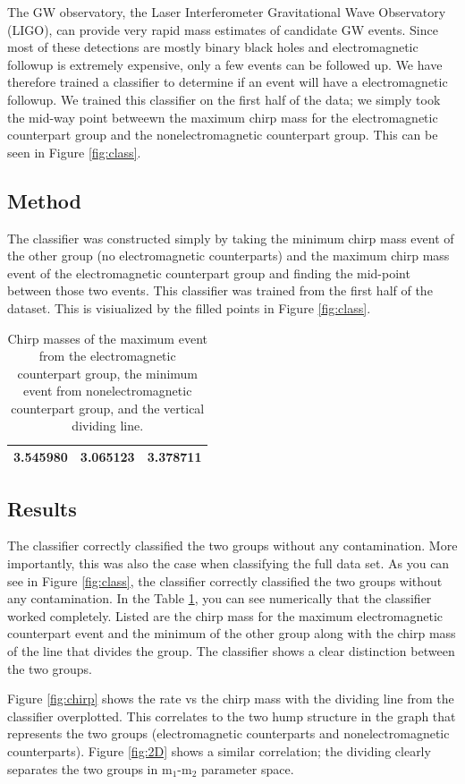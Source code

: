 The GW observatory, the Laser Interferometer Gravitational Wave Observatory (LIGO), can provide very rapid mass estimates of candidate GW events. Since most of these detections are mostly binary black holes and electromagnetic followup is extremely expensive, only a few events can be followed up. We have therefore trained a classifier to determine if an event will have a electromagnetic followup. We trained this classifier on the first half of the data; we simply took the mid-way point betweewn the maximum chirp mass for the electromagnetic counterpart group and the nonelectromagnetic counterpart group. This can be seen in Figure \ref{fig:class}.


\subsection{Method}
The classifier was constructed simply by taking the minimum chirp mass event of the other group (no electromagnetic counterparts) and the maximum chirp mass event of the electromagnetic counterpart group and finding the mid-point between those two events. This classifier was trained from the first half of the dataset. This is visiualized by the filled points in Figure \ref{fig:class}.

\begin{table}[ht]
\caption{Chirp masses of the maximum event from the electromagnetic counterpart group, the minimum event from nonelectromagnetic counterpart group, and the vertical dividing line.}
\centering
\begin{tabular}{c c c}

\hline\hline
3.545980 & 3.065123 & 3.378711\\
\hline\hline
\end{tabular}
\label{tab:mass}
\end{table}

\subsection{Results}
The classifier correctly classified the two groups without any contamination. More importantly, this was also the case when classifying the full data set. As you can see in Figure \ref{fig:class}, the classifier correctly classified the two groups without any contamination. In the Table \ref{tab:mass}, you can see numerically that the classifier worked completely. Listed are the chirp mass for the maximum electromagnetic counterpart event and the minimum of the other group along with the chirp mass of the line that divides the group. The classifier shows a clear distinction between the two groups.



Figure \ref{fig:chirp} shows the rate vs the chirp mass with the dividing line from the classifier overplotted. This correlates to the two hump structure in the graph that represents the two groups (electromagnetic counterparts and nonelectromagnetic counterparts). Figure \ref{fig:2D} shows a similar correlation; the dividing clearly separates the two groups in  m$_{1}$-m$_{2}$ parameter space.
